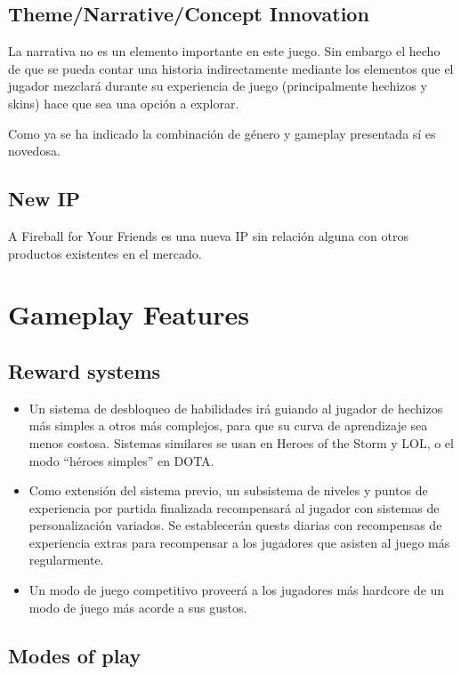 \documentclass[12pt]{article}
\begin{document}
\subsection{Theme/Narrative/Concept Innovation}

La narrativa no es un elemento importante en este juego. Sin embargo el hecho de que se pueda contar una historia indirectamente mediante los elementos que el jugador mezclará durante su experiencia de juego (principalmente hechizos y skins) hace que sea una opción a explorar.

Como ya se ha indicado la combinación de género y gameplay presentada sí es novedosa.

\subsection{New IP}

A Fireball for Your Friends es una nueva IP sin relación alguna con otros productos existentes en el mercado.

\newpage

\section{Gameplay Features}     

\subsection{Reward systems}

\begin{itemize}
\item Un sistema de desbloqueo de habilidades irá guiando al jugador de hechizos más simples a otros más complejos, para que su curva de aprendizaje sea menos costosa. Sistemas similares se usan en Heroes of the Storm y LOL, o el modo ``héroes simples'' en DOTA.
\item Como extensión del sistema previo, un subsistema de niveles y puntos de experiencia por partida finalizada recompensará al jugador con sistemas de personalización variados. Se establecerán quests diarias con recompensas de experiencia extras para recompensar a los jugadores que asisten al juego más regularmente.
\item Un modo de juego competitivo proveerá a los jugadores más hardcore de un modo de juego más acorde a sus gustos.
\end{itemize}     

\subsection{Modes of play}
\end{document}
